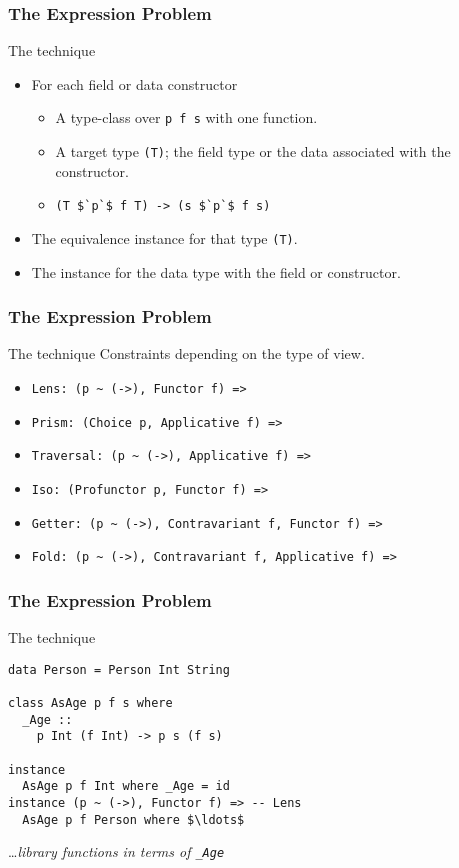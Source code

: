 \begin{frame}[fragile]
\frametitle{The Expression Problem}
\begin{block}{The technique}
\begin{itemize}
\item For each field or data constructor
  \begin{itemize}
    \item A type-class over \lstinline[style=haskell]{p f s} with one function.
    \item A target type \lstinline{(T)}; the field type or the data associated with the constructor.
    \item \lstinline[style=haskell,mathescape]{(T $`p`$ f T) -> (s $`p`$ f s)}
  \end{itemize}
\item The equivalence instance for that type \lstinline{(T)}.
\item The instance for the data type with the field or constructor.
\end{itemize}
\end{block}
\end{frame}

\begin{frame}[fragile]
\frametitle{The Expression Problem}
\begin{block}{The technique}
Constraints depending on the type of view.
\begin{itemize}
\item \lstinline[style=haskell,mathescape]{Lens: (p ~ (->), Functor f) =>}
\item \lstinline[style=haskell,mathescape]{Prism: (Choice p, Applicative f) =>}
\item \lstinline[style=haskell,mathescape]{Traversal: (p ~ (->), Applicative f) =>}
\item \lstinline[style=haskell,mathescape]{Iso: (Profunctor p, Functor f) =>}
\item \lstinline[style=haskell,mathescape]{Getter: (p ~ (->), Contravariant f, Functor f) =>}
\item \lstinline[style=haskell,mathescape]{Fold: (p ~ (->), Contravariant f, Applicative f) =>}
\end{itemize}
\end{block}
\end{frame}

\begin{frame}[fragile]
\frametitle{The Expression Problem}
\begin{block}{The technique}
\begin{lstlisting}[style=haskell,mathescape]
data Person = Person Int String

class AsAge p f s where
  _Age ::
    p Int (f Int) -> p s (f s)

instance
  AsAge p f Int where _Age = id
instance (p ~ (->), Functor f) => -- Lens
  AsAge p f Person where $\ldots$
\end{lstlisting}
\ldots \emph{library functions in terms of \lstinline[style=haskell]{_Age}}
\end{block}
\end{frame}

